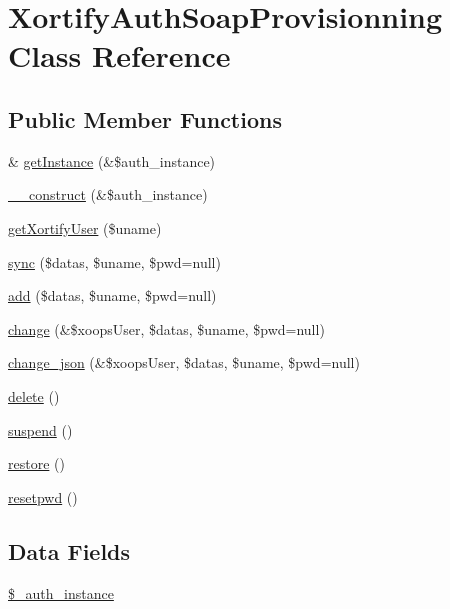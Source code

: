 \hypertarget{class_xortify_auth_soap_provisionning}{\section{Xortify\-Auth\-Soap\-Provisionning Class Reference}
\label{class_xortify_auth_soap_provisionning}
}
\subsection*{Public Member Functions}
\begin{DoxyCompactItemize}
\item 
\& \hyperlink{class_xortify_auth_soap_provisionning_a2c8eaa915c70d75289ac8a03686194f9}{get\-Instance} (\&\$auth\-\_\-instance)
\item 
\hyperlink{class_xortify_auth_soap_provisionning_a0f25832dc86774e7605b81fe57b083c2}{\-\_\-\-\_\-construct} (\&\$auth\-\_\-instance)
\item 
\hyperlink{class_xortify_auth_soap_provisionning_a041d726ac26672547ed1504e8e0117aa}{get\-Xortify\-User} (\$uname)
\item 
\hyperlink{class_xortify_auth_soap_provisionning_a35dc08b0f2138eb818ff95345b73bcff}{sync} (\$datas, \$uname, \$pwd=null)
\item 
\hyperlink{class_xortify_auth_soap_provisionning_adfc9fcef01e7bd7b2f47e8e79d51fc63}{add} (\$datas, \$uname, \$pwd=null)
\item 
\hyperlink{class_xortify_auth_soap_provisionning_ae1f0971b9712c794620cf309164e43af}{change} (\&\$xoops\-User, \$datas, \$uname, \$pwd=null)
\item 
\hyperlink{class_xortify_auth_soap_provisionning_a94f4e0408f26e65abca347ec883f4ec9}{change\-\_\-json} (\&\$xoops\-User, \$datas, \$uname, \$pwd=null)
\item 
\hyperlink{class_xortify_auth_soap_provisionning_a13bdffdd926f26b825ea57066334ff01}{delete} ()
\item 
\hyperlink{class_xortify_auth_soap_provisionning_ad73006a505121228f3b075c2409787d2}{suspend} ()
\item 
\hyperlink{class_xortify_auth_soap_provisionning_aa1371f22826cf8cde4454c9b467203d0}{restore} ()
\item 
\hyperlink{class_xortify_auth_soap_provisionning_a06d70fbd3a2db390b6f2530c0076628e}{resetpwd} ()
\end{DoxyCompactItemize}
\subsection*{Data Fields}
\begin{DoxyCompactItemize}
\item 
\hyperlink{class_xortify_auth_soap_provisionning_a486ed878bb5a7188c99ac4c9ee46ac6e}{\$\-\_\-auth\-\_\-instance}
\end{DoxyCompactItemize}



